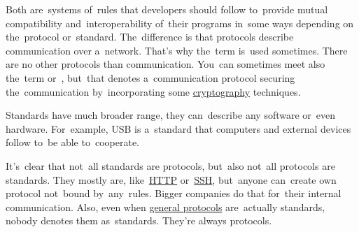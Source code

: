 \label{protocolstandard}
Both are~systems of~rules that developers should follow to~provide mutual compatibility and~interoperability of~their programs in~some ways depending on the~protocol or~standard.
The~difference is that protocols describe communication over a~network.
That's why the~term  is~used sometimes.
There are no other protocols than communication.
You~can sometimes meet also the~term  or~, but~that denotes a~communication protocol securing the~communication by~incorporating some \hyperref[cryptography]{cryptography} techniques.

Standards have much broader range, they can~describe any software or~even hardware.
For~example, USB is a~standard that computers and external devices follow to~be able to~cooperate.

\warning It's~clear that not~all standards are protocols, but~also not~all protocols are standards.
They mostly are, like~\hyperref[http]{HTTP} or~\hyperref[ssh]{SSH}, but~anyone can~create own protocol not~bound by~any~rules.
Bigger companies do that for~their internal communication.
Also, even when \hyperref[networkprotocols]{general protocols} are~actually standards, nobody denotes them as~standards.
They're always protocols.
